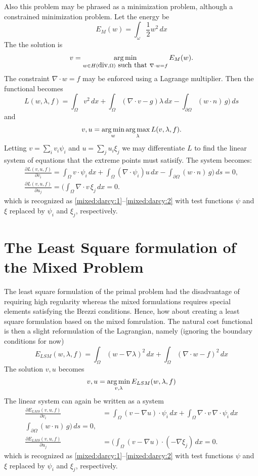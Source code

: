 Also this problem may be phrased as a minimization problem, although a constrained minimization problem. 
Let the energy be 
\[
E_{M}(w) = \int_\omega \frac{1}{2} w^2 \, dx  
\]
The the solution is  
\begin{align}
v = \operatorname*{arg\,min}_{w \in H(\mbox{div}, \Omega) \mbox{ such that }  \nabla \cdot w = f  } E_{M} (w) .   
\end{align}
The constraint $\nabla \cdot w = f$ may be enforced using a Lagrange multiplier. Then the functional
becomes  
\[
L(w,\lambda, f) = \int_\Omega v^2 \, dx + \int_\Omega (\nabla \cdot v - g) \lambda  \, dx - \int_{\partial \Omega} (w\cdot n) \,  g)  \, ds   
\]
and 
\begin{align}
v, u = \operatorname*{arg\,min}_{w} \operatorname*{arg\,max}_{\lambda} L(v, \lambda, f) .   
\end{align}
Letting  $v = \sum_i v_i \psi_i$    and $u = \sum_j u_i \xi_j$ we may differentiate $L$ to find the 
linear system of equations that the extreme points must satisify.     
The system becomes:  
\begin{align}
 \frac{\partial L (v, u, f)}{ \partial v_i} =  \int_\Omega v \cdot \psi_i \, dx + \int_\Omega (\nabla \cdot \psi_i ) u \, dx  -  
 \int_{\partial \Omega} (w\cdot n) \,  g)  \, ds = 0, \\    
 \frac{\partial L (v, u, f)}{ \partial u_j} = ( \int_\Omega \nabla \cdot v \,   \xi_j \, dx  = 0 .    
\end{align}
which is recognized as 
\eqref{mixed:darcy:1}--\eqref{mixed:darcy:2} with test functions $\psi$ and $\xi$ replaced by  $\psi_i$ and $\xi_j$, respectively.  


\section{The Least Square formulation of the Mixed Problem}
The least square formulation of the primal problem had the disadvantage of requiring high regularity whereas
the mixed formulations requires special elements satisfying the Brezzi conditions. Hence, how about
creating a least square formulation based on the mixed fomrulation. The natural cost functional is then 
a slight reformulation of the Lagrangian, namely (ignoring the boundary conditions for now)    
\[
E_{LSM}(w,\lambda, f) = \int_\Omega (w-\nabla \lambda)^2 \, dx + \int_\Omega (\nabla \cdot w - f)^2   \, dx    
\]
The solution $v, u$ becomes  
\[
v, u = \operatorname*{arg\,min}_{v, \lambda} E_{LSM}(w,\lambda, f) 
\]
The linear system can again be written as a system  
\begin{align}
\label{mixed:ls:1}
 \frac{\partial E_{LMS} (v, u, f)}{ \partial v_i} &=  \int_\Omega (v - \nabla u) \cdot \psi_i \, dx + \int_\Omega \nabla \cdot v \,  \nabla \cdot \psi_i  \, dx  \\   
\label{mixed:ls:2}
 \int_{\partial \Omega} (w\cdot n) \,  g)  \, ds = 0, \\    
 \frac{\partial E_{LMS} (v, u, f)}{ \partial u_j} &= ( \int_\Omega (v - \nabla  u)\cdot(-\nabla \xi_j) \, dx  = 0 .    
\end{align}
which is recognized as 
\eqref{mixed:darcy:1}--\eqref{mixed:darcy:2} with test functions $\psi$ and $\xi$ replaced by  $\psi_i$ and $\xi_j$, respectively.  

